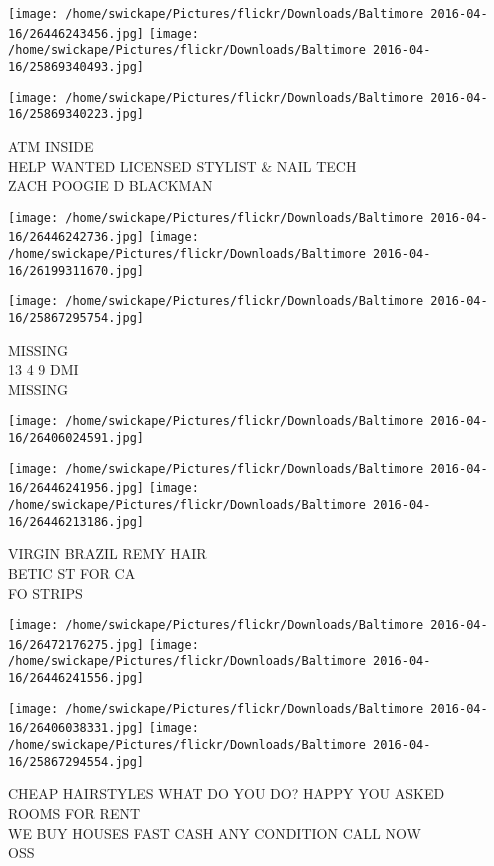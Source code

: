 \documentclass[10pt,letterpaper]{article}
\begin{document}
\texttt{[image: /home/swickape/Pictures/flickr/Downloads/Baltimore 2016-04-16/26446243456.jpg]}
\texttt{[image: /home/swickape/Pictures/flickr/Downloads/Baltimore 2016-04-16/25869340493.jpg]}

\vspace{0.25in}
\texttt{[image: /home/swickape/Pictures/flickr/Downloads/Baltimore 2016-04-16/25869340223.jpg]}

ATM INSIDE\\
HELP WANTED LICENSED STYLIST \& NAIL TECH\\
ZACH POOGIE D BLACKMAN
\pagebreak

\texttt{[image: /home/swickape/Pictures/flickr/Downloads/Baltimore 2016-04-16/26446242736.jpg]}
\texttt{[image: /home/swickape/Pictures/flickr/Downloads/Baltimore 2016-04-16/26199311670.jpg]}

\texttt{[image: /home/swickape/Pictures/flickr/Downloads/Baltimore 2016-04-16/25867295754.jpg]}

MISSING\\
13 4 9 DMI\\
MISSING
\pagebreak

\texttt{[image: /home/swickape/Pictures/flickr/Downloads/Baltimore 2016-04-16/26406024591.jpg]}

\vspace{0.25in}
\texttt{[image: /home/swickape/Pictures/flickr/Downloads/Baltimore 2016-04-16/26446241956.jpg]}
\texttt{[image: /home/swickape/Pictures/flickr/Downloads/Baltimore 2016-04-16/26446213186.jpg]}

VIRGIN BRAZIL REMY HAIR\\
BETIC ST FOR CA\\
FO STRIPS
\pagebreak

\texttt{[image: /home/swickape/Pictures/flickr/Downloads/Baltimore 2016-04-16/26472176275.jpg]}
\texttt{[image: /home/swickape/Pictures/flickr/Downloads/Baltimore 2016-04-16/26446241556.jpg]}

\texttt{[image: /home/swickape/Pictures/flickr/Downloads/Baltimore 2016-04-16/26406038331.jpg]}
\texttt{[image: /home/swickape/Pictures/flickr/Downloads/Baltimore 2016-04-16/25867294554.jpg]}

CHEAP HAIRSTYLES WHAT DO YOU DO? HAPPY YOU ASKED\\
ROOMS FOR RENT\\
WE BUY HOUSES FAST CASH ANY CONDITION CALL NOW\\
OSS
\pagebreak
\end{document}
